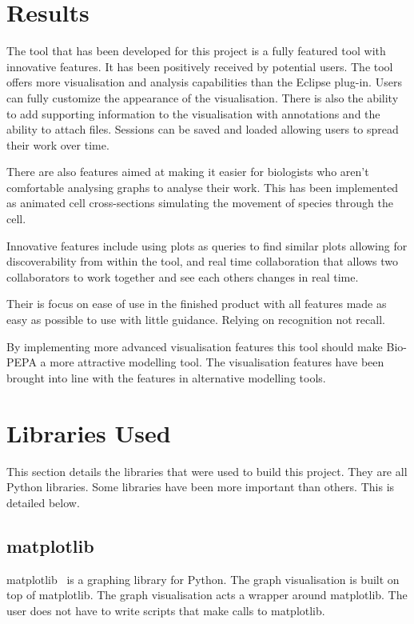 \section{Results}

The tool that has been developed for this project is a fully featured tool with innovative features.  It has been positively received by potential users.
The tool offers more visualisation and analysis capabilities than the Eclipse plug-in.  Users can fully customize the appearance of the visualisation.  There is also the ability to add supporting information to the visualisation with annotations and the ability to attach files.  Sessions can be saved and loaded allowing users to spread their work over time.

There are also features aimed at making it easier for biologists who aren't comfortable analysing graphs to analyse their work.  This has been implemented as animated cell cross-sections simulating the movement of species through the cell.

Innovative features include using plots as queries to find similar plots allowing for discoverability from within the tool, and real time collaboration that allows two collaborators to work together and see each others changes in real time.

Their is focus on ease of use in the finished product with all features made as easy as possible to use with little guidance.  Relying on recognition not recall.

By implementing more advanced visualisation features this tool should make Bio-PEPA a more attractive modelling tool. The visualisation features have been brought into line with the features in alternative modelling tools.

\section{Libraries Used}

This section details the libraries that were used to build this project.  They are all Python libraries.  Some libraries have been more important than others.  This is detailed below.

\subsection{matplotlib}

matplotlib~\cite{mpl} is a graphing library for Python.  The graph visualisation is built on top of matplotlib.  The graph visualisation acts a wrapper around matplotlib.  The user does not have to write scripts that make calls to matplotlib.

